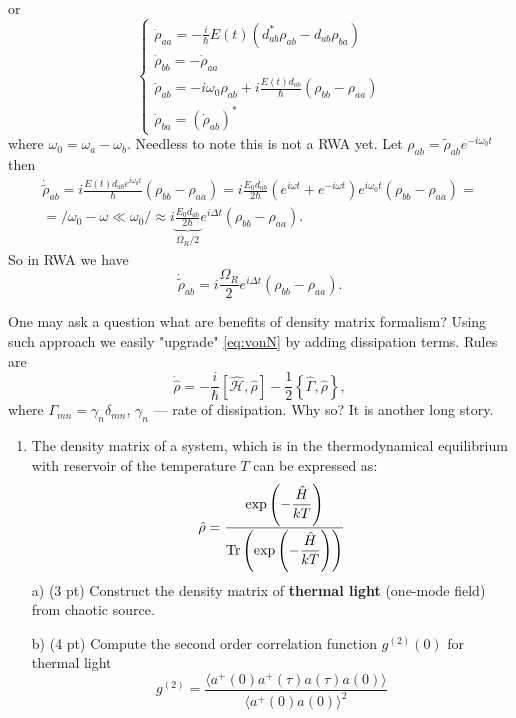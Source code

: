 or
\begin{equation}
	\begin{cases}
		\dot{\rho}_{aa} = - \frac{i}{\hbar} E(t) \left( d^*_{ab} \rho_{ab} - d_{ab} \rho_{ba} \right) \\
		\dot{\rho}_{bb} = - \dot{\rho}_{aa} \\
		\dot{\rho}_{ab} = - i \omega_0 \rho_{ab} + i \frac{E(t) d_{ab}}{\hbar} \left( \rho_{bb} - \rho_{aa} \right) \\
		\dot{\rho}_{ba} = \left( \dot{\rho}_{ab} \right)^*
	\end{cases}
	\label{eq:dens_system}
\end{equation}
where $\omega_0 = \omega_a - \omega_b$. Needless to note this is not a RWA yet. Let $\rho_{ab} = \widetilde{\rho}_{ab} e^{-i \omega_0 t}$ then
\begin{multline}
	\dot{\widetilde{\rho}}_{ab} = i \frac{E(t) d_{ab} e^{i \omega_0 t}}{\hbar} \left( \rho_{bb} - \rho_{aa} \right) = i \frac{E_0 d_{ab}}{2 \hbar} \left( e^{i \omega t} + e^{- i \omega t} \right) e^{i \omega_0 t} \left( \rho_{bb} - \rho_{aa} \right) = \\ = \Big/ \omega_0 - \omega \ll \omega_0 \Big/ \approx
	i \underbrace{\frac{E_0 d_{ab}}{2 \hbar}}_{\Omega_R/2} e^{i \Delta t}\left( \rho_{bb} - \rho_{aa} \right).
\end{multline}
So in RWA we have
\begin{equation}
	\dot{\widetilde{\rho}}_{ab} = i \frac{\Omega_R}{2} e^{i \Delta t} \left( \rho_{bb} - \rho_{aa} \right).
\end{equation}

One may ask a question what are benefits of density matrix formalism? Using such approach we easily "upgrade" \eqref{eq:vonN} by adding dissipation terms. Rules are
\begin{equation}
	\dot{\hat{\rho}} = - \frac{i}{\hbar} \left[ \hat{\mathscr{H}}, \hat{\rho} \right] - \frac{1}{2} \left\{ \hat{\Gamma}, \hat{\rho} \right\},
\end{equation}
where $\Gamma_{mn} = \gamma_{n} \delta_{mn}$, $\gamma_n$ --- rate of dissipation. Why so? It is another long story.


\begin{hw}

	\begin{enumerate}
		\item The density matrix of a system, which is in the thermodynamical equilibrium with reservoir of the temperature $T$ can be expressed as:
		$$
		\hat{\rho}=\frac{\exp\left(-\dfrac{\hat{H}}{kT}\right)}{\operatorname{Tr}\left(\exp\left(-\dfrac{\hat{H}}{kT}\right)\right)}
		$$
		a) (3 pt) Construct the density matrix of  {\bf thermal light} (one-mode field) from chaotic source.
		
		b) (4 pt) Compute the second order correlation function $g^{(2)}(0)$  for thermal light
		$$
		g^{(2)}=\frac{\langle a^{+}(0)a^{+}(\tau)a(\tau)a(0)\rangle}{\langle a^{+}(0)a(0)\rangle^{2}}
		$$
	\end{enumerate}		
\end{hw}

